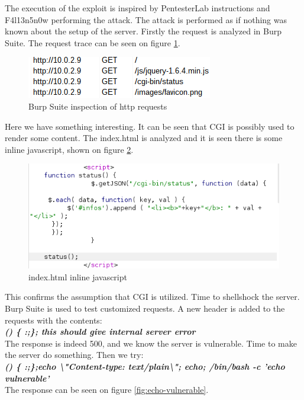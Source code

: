 The execution of the exploit is inspired by PentesterLab instructions and F4l13n5n0w\cite{fallensnow} performing the attack. The attack is performed as if nothing was known about the setup of the server. Firstly the request is analyzed in Burp Suite. The request trace can be seen on figure \ref{fig:http-requests}. 

\begin{figure} [ht]
    \centering
    \includegraphics[width=\columnwidth]{../pictures/http-requests.png}
    \caption{Burp Suite inspection of http requests}
    \label{fig:http-requests}
\end{figure}


Here we have something interesting. It can be seen that CGI is possibly used to render some content. The index.html is analyzed and it is seen there is some inline javascript, shown on figure \ref{fig:inline-js}.

\begin{figure} [ht]
    \centering
    \includegraphics[width=\columnwidth]{../pictures/html-inline-js-script.png}
    \caption{index.html inline javascript}
    \label{fig:inline-js}
\end{figure}

This confirms the assumption that CGI is utilized. Time to shellshock the server. Burp Suite is used to test customized requests. A new header is added to the requests with the contents: \\
\textbf{\textit{() \{ :;\}; this should give internal server error}}\\
 The response is indeed 500, and we know the server is vulnerable. Time to make the server do something. Then we try: \\  
 \textbf{\textit{() \{ :;\};echo \textbackslash"Content-type: text/plain\textbackslash"; echo; /bin/bash -c 'echo vulnerable'}} \\
 The response can be seen on figure \ref{fig:echo-vulnerable}.


